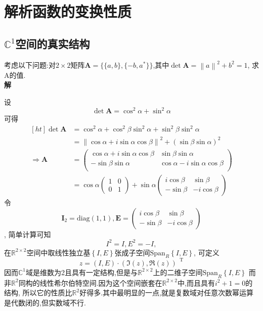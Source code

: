\documentclass[UTF8]{ctexart}
\newcommand{\tr}{\mathop{}\!\mathrm{T}}
\begin{document}
\section{解析函数的变换性质}
\subsection{$\mathbb{C}^{1}$空间的真实结构}
考虑以下问题:对$2\times2$矩阵$\mathbf{A}=\{\{a,b\},\{-b,a^{*}\}\}$,其中$\det \mathbf{A}=\left\| a \right\|^{2}+b^2=1$,
求A的值. \\
\textbf{解}

设
\begin{equation}
  \det \mathbf{A}=\cos^{2} \alpha+\sin^{2} \alpha
\end{equation}
可得
\begin{equation}
  \begin{aligned}
    [ht]
    \det \mathbf{A}
  &=\cos^{2} \alpha+\cos^{2} \beta\sin^{2} \alpha+\sin^{2} \beta\sin^{2} \alpha \\
  &=\left\| \cos\alpha+i\sin \alpha\cos\beta \right\|^{2}+(\sin\beta\sin\alpha)^{2} \\
  \Rightarrow\mathbf{A}&=\left(\begin{matrix}
    \cos\alpha+i\sin \alpha\cos\beta&\sin\beta\sin\alpha \\
    -\sin\beta\sin\alpha&\cos\alpha-i\sin \alpha\cos\beta \\
  \end{matrix}\right)  \\
  &=\cos\alpha\left(\begin{matrix}
    1&0 \\ 0&1
  \end{matrix}\right)
  +\sin \alpha\left(\begin{matrix}
    i \cos\beta&\sin\beta \\ -\sin\beta&-i \cos\beta
  \end{matrix}\right)
  \end{aligned}
\end{equation}
令
\begin{equation}
  \mathbf{I}_{2}=\mathrm{diag} \left(1,1\right),\mathbf{E}=\left(\begin{matrix}
    i \cos\beta&\sin\beta \\ -\sin\beta&-i \cos\beta
  \end{matrix}\right)
\end{equation},
简单计算可知
\begin{equation}
  I^{2}=I,E^{2}=-I,
\end{equation}
在$\mathbb{R}^{2\times 2}$空间中取线性独立基$\left\{I,E\right\}$张成子空间$\mathrm{Span}_{R}\left\{I,E\right\}$,
可定义
\begin{equation}
  z=(I,E)\cdot(\Im(z),\Re(z))^{\tr}
\end{equation}
因而$\mathbb{C}^{1}$域是维数为2且具有一定结构,但是与$\mathbb{R}^{2\times 2}$上的二维子空间$\mathrm{Span}_{R}\left\{I,E\right\}$
而非$\mathbb{R}^{2}$同构的线性希尔伯特空间.因为这个空间嵌套在$\mathbb{R}^{2\times 2}$中,而且具有$i^2+1=0$的结构,
所以它的性质比$\mathbb{R}^{2}$好得多.其中最明显的一点,就是复数域对任意次数幂运算是代数闭的,但实数域不行.
\end{document}
